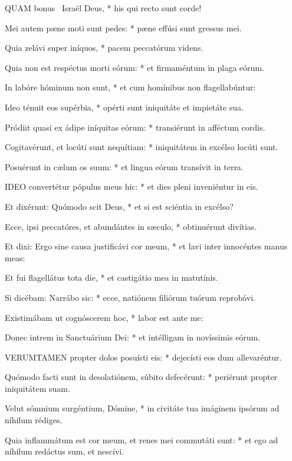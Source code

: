 
\lettrine[lines=2]{Q}{UAM} bonus \textdagger\ Israël Deus, * his qui recto sunt corde!

Mei autem pæne moti sunt pedes: * pæne effúsi sunt gressus mei.

Quia zelávi super iníquos, * pacem peccatórum videns.

Quia non est respéctus morti eórum: * et firmaméntum in plaga eórum.

In labóre hóminum non sunt, * et cum homínibus non flagellabúntur:

Ideo ténuit eos supérbia, * opérti sunt iniquitáte et impietáte sua.

Pródiit quasi ex ádipe iníquitas eórum: * transiérunt in afféctum cordis.

Cogitavérunt, et locúti sunt nequítiam: * iniquitátem in excélso locúti sunt.

Posuérunt in cælum os suum: * et lingua eórum transívit in terra.


\lettrine[lines=2]{I}{DEO} convertétur pópulus meus hic: * et dies pleni inveniéntur in eis.

Et dixérunt: Quómodo scit Deus, * et si est sciéntia in excélso?

Ecce, ipsi peccatóres, et abundántes in sæculo, * obtinuérunt divítias.

Et dixi: Ergo sine causa justificávi cor meum, * et lavi inter innocéntes manus meas:

Et fui flagellátus tota die, * et castigátio mea in matutínis.

Si dicébam: Narrábo sic: * ecce, natiónem filiórum tuórum reprobávi.

Existimábam ut cognóscerem hoc, * labor est ante me:

Donec intrem in Sanctuárium Dei: * et intélligam in novíssimis eórum.


\lettrine[lines=2]{V}{ERUMTAMEN} propter dolos posuísti eis: * dejecísti eos dum allevaréntur.

Quómodo facti sunt in desolatiónem, súbito defecérunt: * periérunt propter iniquitátem suam.

Velut sómnium surgéntium, Dómine, * in civitáte tua imáginem ipsórum ad níhilum rédiges.

Quia inflammátum est cor meum, et renes mei commutáti sunt: * et ego ad níhilum redáctus sum, et nescívi.

